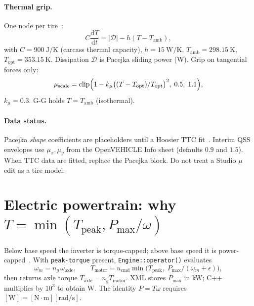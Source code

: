 \documentclass[11pt,letterpaper]{article}
\begin{document}
\paragraph{Thermal grip.}
One node per tire~\cite{milliken}:
\begin{equation}
  C\frac{\mathrm{d}T}{\mathrm{d}t} = |\mathcal{D}| - h(T-T_{\mathrm{amb}}),
  \label{eq:thermal}
\end{equation}
with $C=\SI{900}{\joule\per\kelvin}$ (carcass thermal capacity),
$h=\SI{15}{\watt\per\kelvin}$, $T_{\mathrm{amb}}=\SI{298.15}{\kelvin}$,
$T_{\mathrm{opt}}=\SI{353.15}{\kelvin}$. Dissipation $\mathcal{D}$ is
Pacejka sliding power (\si{\watt}). Grip on tangential forces only:
\begin{equation}
  \mu_{\mathrm{scale}}
  = \mathrm{clip}\Bigl(1 - k_\mu \bigl((T-T_{\mathrm{opt}})/T_{\mathrm{opt}}\bigr)^2,\;
    0.5,\; 1.1\Bigr),
\end{equation}
$k_\mu=0.3$. G-G holds $T=T_{\mathrm{amb}}$ (isothermal).

\paragraph{Data status.}
Pacejka \emph{shape} coefficients are placeholders until a Hoosier TTC
fit~\cite{ttc}. Interim QSS envelopes use $\mu_x,\mu_y$ from the
OpenVEHICLE Info sheet (defaults $0.9$ and $1.5$). When TTC data are
fitted, replace the Pacejka block. Do not treat a Studio $\mu$ edit as
a tire model.

\section[Electric powertrain torque-speed envelope]%
        {Electric powertrain: why $T=\min(T_{\mathrm{peak}},P_{\max}/\omega)$}
\label{sec:ev}

Below base speed the inverter is torque-capped; above base speed it is
power-capped~\cite{fsae-rules}. With \texttt{peak-torque} present,
\texttt{Engine::operator()} evaluates
\begin{equation}
  \omega_m = n_g\,\omega_{\mathrm{axle}},\qquad
  T_{\mathrm{motor}}
  = u_{\mathrm{cmd}}\min\bigl(T_{\mathrm{peak}},\;
    P_{\max}/(\omega_m+\epsilon)\bigr),
  \label{eq:envelope}
\end{equation}
then returns axle torque $T_{\mathrm{axle}}=n_g T_{\mathrm{motor}}$. XML
stores $P_{\max}$ in \si{\kilo\watt}; C++ multiplies by $10^3$ to obtain
\si{\watt}. The identity $P=T\omega$ requires
$[\mathrm{W}]=[\mathrm{N\cdot m}][\mathrm{rad/s}]$.
\end{document}
